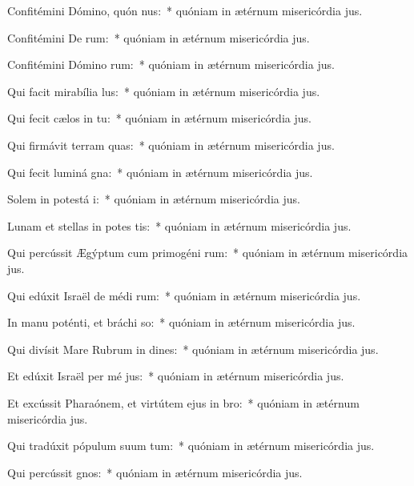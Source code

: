 \item Confitémini Dómino, quón nus:~* quóniam in ætérnum misericórdia jus.
\item Confitémini De rum:~* quóniam in ætérnum misericórdia jus.
\item Confitémini Dómino rum:~* quóniam in ætérnum misericórdia jus.
\item Qui facit mirabília  lus:~* quóniam in ætérnum misericórdia jus.
\item Qui fecit cælos in tu:~* quóniam in ætérnum misericórdia jus.
\item Qui firmávit terram  quas:~* quóniam in ætérnum misericórdia jus.
\item Qui fecit luminá gna:~* quóniam in ætérnum misericórdia jus.
\item Solem in potestá i:~* quóniam in ætérnum misericórdia jus.
\item Lunam et stellas in potes tis:~* quóniam in ætérnum misericórdia jus.
\item Qui percússit Ægýptum cum primogéni rum:~* quóniam in ætérnum misericórdia jus.
\item Qui edúxit Israël de médi rum:~* quóniam in ætérnum misericórdia jus.
\item In manu poténti, et bráchi so:~* quóniam in ætérnum misericórdia jus.
\item Qui divísit Mare Rubrum in dines:~* quóniam in ætérnum misericórdia jus.
\item Et edúxit Israël per mé jus:~* quóniam in ætérnum misericórdia jus.
\item Et excússit Pharaónem, et virtútem ejus in  bro:~* quóniam in ætérnum misericórdia jus.
\item Qui tradúxit pópulum suum  tum:~* quóniam in ætérnum misericórdia jus.
\item Qui percússit  gnos:~* quóniam in ætérnum misericórdia jus.
